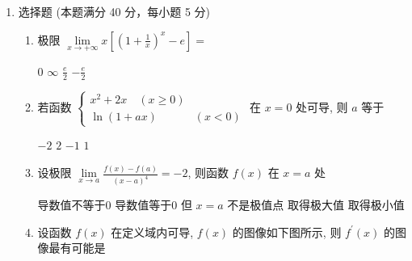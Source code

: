 


\begin{enumerate}
	\item
	选择题 (本题满分 40 分，每小题 5 分)
	\begin{enumerate}
		\item
		极限 $\lim\limits _{x \rightarrow + \infty}x\left[\left(1+\frac{1}{x}\right)^{x}-e\right]=$  
		
		
	\fourchoices
	{$ 0 $}
	{$\infty$}
	{$\frac{e}{2}$}
	{$-\frac{e}{2}$}



	
	\item 
	若函数 $\left\{\begin{array}{ll}x^{2}+2 x \quad(x \geqslant 0) \\ \ln (1+a x) & (x<0)\end{array}\right.$ 在 $x=0$ 处可导, 则 $a$ 等于	  
	
	
\fourchoices
{$-2$}
{$ 2 $}
{$-1$}
{$ 1 $}

\item 
设极限 $\lim\limits _{x \rightarrow a} \frac{f(x)-f(a)}{(x-a)^{4}}=-2$, 则函数 $f(x)$ 在 $x=a$ 处  


\fourchoices
{导数值不等于$ 0 $}
{导数值等于$ 0 $ 但 $x=a$ 不是极值点}
{取得极大值}
{取得极小值}

\item 
设函数 $f(x)$ 在定义域内可导, $f(x)$ 的图像如下图所示, 则 $f^{\prime}(x)$ 的图像最有可能是  
\begin{figure}[h!]
	\centering
	
\end{figure}
\pfourchoices
{}
{}
{}
{}


\end{enumerate}
\end{enumerate}

